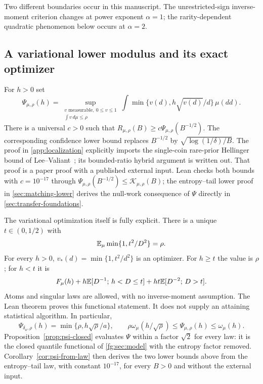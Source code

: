 Two different boundaries occur in this manuscript. The unrestricted-sign
inverse-moment criterion changes at power exponent $\alpha=1$; the
rarity-dependent quadratic phenomenon below occurs at $\alpha=2$.

\subsection{A variational lower modulus and its exact optimizer}
For $h>0$ set
\begin{equation}\label{eq:v5-psi}
 \Psi_{\mu,\rho}(h)=
 \sup_{\substack{v\text{ measurable},\ 0\le v\le1\\\int v\,d\mu\le\rho}}
       \int\min\{v(d),h\sqrt{v(d)}/d\}\,\mu(dd).
\end{equation}
There is a universal $c>0$ such that
$R_{\mu,\rho}(B)\ge c\Psi_{\mu,\rho}(B^{-1/2})$.
The corresponding confidence lower bound replaces $B^{-1/2}$ by
$\sqrt{\log(1/\delta)/B}$. The proof in \cref{app:localization}
explicitly imports the single-coin rare-prior Hellinger bound of
Lee--Valiant~\cite[Corollary 19]{leevaliant}; its bounded-ratio hybrid
argument is written out. That proof is a paper proof with a published
external input. Lean checks both bounds with $c=10^{-17}$ through
$\Psi_{\mu,\rho}(B^{-1/2})\le\mathcal K_{\mu,\rho}(B)$; the
entropy--tail lower proof in \cref{sec:matching-lower} derives the
null-work consequence of $\Psi$ directly in
\cref{sec:transfer-foundations}.

The variational optimization itself is fully explicit. There is a unique
$t\in(0,1/2)$ with
\[
 \mathbb E_\mu\min\{1,t^2/D^2\}=\rho.
\]
For every $h>0$, $v_*(d)=\min\{1,t^2/d^2\}$ is an optimizer. For $h\ge t$
the value is $\rho$; for $h<t$ it is
\begin{equation}\label{eq:v5-psi-form}
 F_\mu(h)+h\mathbb E[D^{-1};\,h<D\le t]+ht\mathbb E[D^{-2};\,D>t].
\end{equation}
Atoms and singular laws are allowed, with no inverse-moment assumption.
The Lean theorem
 proves this
functional statement. It does not supply an attaining statistical
algorithm. In particular,
\[
 \Psi_{\delta_a,\rho}(h)=\min\{\rho,h\sqrt\rho/a\},\qquad
 \rho\omega_\mu(h/\sqrt\rho)\le\Psi_{\mu,\rho}(h)\le\omega_\mu(h).
\]
Proposition~\ref{prop:psi-closed} evaluates $\Psi$ within a factor $\sqrt2$
for every law: it is the closed quantile functional of \cref{fg:sec:model}
with the entropy factor removed. Corollary~\ref{cor:psi-from-law} then
derives the two lower bounds above from the entropy--tail law, with
constant $10^{-17}$, for every $B>0$ and without the external input.

